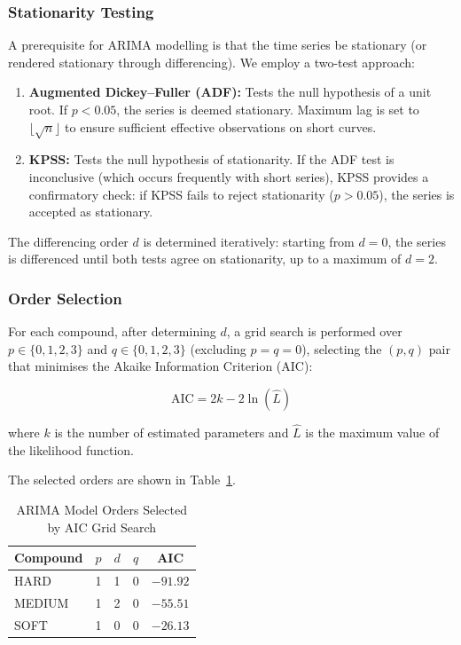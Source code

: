 \documentclass[journal,twoside]{IEEEtran}
\begin{document}
\subsubsection{Stationarity Testing}\label{sec:stationarity}

A prerequisite for ARIMA modelling is that the time series be stationary
(or rendered stationary through differencing).  We employ a two-test
approach:

\begin{enumerate}
  \item \textbf{Augmented Dickey--Fuller (ADF):}  Tests the null
  hypothesis of a unit root.  If $p < 0.05$, the series is deemed
  stationary.  Maximum lag is set to $\lfloor\sqrt{n}\rfloor$ to ensure
  sufficient effective observations on short curves.

  \item \textbf{KPSS:}  Tests the null hypothesis of stationarity.  If
  the ADF test is inconclusive (which occurs frequently with short
  series), KPSS provides a confirmatory check: if KPSS fails to reject
  stationarity ($p > 0.05$), the series is accepted as stationary.
\end{enumerate}

The differencing order $d$ is determined iteratively: starting from
$d=0$, the series is differenced until both tests agree on
stationarity, up to a maximum of $d=2$.

\subsubsection{Order Selection}

For each compound, after determining $d$, a grid search is performed
over $p \in \{0, 1, 2, 3\}$ and $q \in \{0, 1, 2, 3\}$ (excluding
$p=q=0$), selecting the $(p,q)$ pair that minimises the Akaike
Information Criterion (AIC):

\begin{equation}
  \text{AIC} = 2k - 2\ln(\hat{L})
  \label{eq:aic}
\end{equation}

\noindent where $k$ is the number of estimated parameters and $\hat{L}$
is the maximum value of the likelihood function.

The selected orders are shown in Table~\ref{tab:arima_orders}.

\begin{table}[!t]
\caption{ARIMA Model Orders Selected by AIC Grid Search}
\label{tab:arima_orders}
\centering
\footnotesize
\begin{tabular}{@{}lcccc@{}}
\toprule
\textbf{Compound} & \textbf{$p$} & \textbf{$d$} & \textbf{$q$} & \textbf{AIC} \\
\midrule
HARD   & 1 & 1 & 0 & $-91.92$ \\
MEDIUM & 1 & 2 & 0 & $-55.51$ \\
SOFT   & 1 & 0 & 0 & $-26.13$ \\
\bottomrule
\end{tabular}
\end{table}
\end{document}

